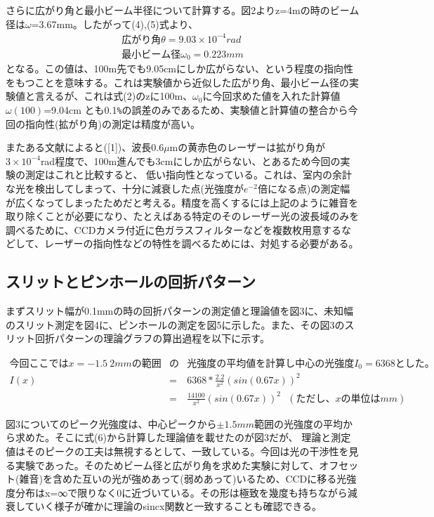 \documentclass[11pt,a4j]{jsarticle}
\begin{document}
  さらに広がり角と最小ビーム半径について計算する。図2よりz=4mの時のビーム径は$\omega$=3.67mm。したがって(4),(5)式より、
  \begin{eqnarray}
   広がり角  \theta = 9.03 × 10^{-4} rad \nonumber \\
   最小ビーム径  \omega_0 = 0.223mm \nonumber
  \end{eqnarray}
  となる。この値は、100m先でも9.05cmにしか広がらない、という程度の指向性をもつことを意味する。これは実験値から近似した広がり角、最小ビーム径の実験値と言えるが、これは式(2)のzに100m、$\omega_0$に今回求めた値を入れた計算値$\omega(100)$=9.04cm
  とも0.1\verb|%|の誤差のみであるため、実験値と計算値の整合から今回の指向性(拡がり角)の測定は精度が高い。
  
  またある文献によると([1])、波長0.6$\mu$mの黄赤色のレーザーは拡がり角が$3×10^{-4}$rad程度で、100m進んでも3cmにしか広がらない、とあるため今回の実験の測定はこれと比較すると、
  低い指向性となっている。これは、室内の余計な光を検出してしまって、十分に減衰した点(光強度が$e^{-2}$倍になる点)の測定幅が広くなってしまったためだと考える。精度を高くするには上記のように雑音を取り除くことが必要になり、たとえばある特定のそのレーザー光の波長域のみを調べるために、CCDカメラ付近に色ガラスフィルターなどを複数枚用意するなどして、レーザーの指向性などの特性を調べるためには、対処する必要がある。
  
  \clearpage
  
  \subsection{スリットとピンホールの回折パターン}
  まずスリット幅が0.1mmの時の回折パターンの測定値と理論値を図3に、未知幅のスリット測定を図4に、ピンホールの測定を図5に示した。また、その図3のスリット回折パターンの理論グラフの算出過程を以下に示す。

\begin{eqnarray}
今回ここではx=-1.5~2mmの範囲&の&光強度の平均値を計算し中心の光強度I_0 = 6368 とした。 \nonumber \\
I(x) &=& 6368 * \frac{2.2}{x^2} (sin(0.67x))^2 \nonumber \\
       &=& \frac{14100}{x^2} (sin(0.67x))^2 \ \ \ (ただし、xの単位はmm) \nonumber
\end{eqnarray}

  
  図3についてのピーク光強度は、中心ピークから$\pm 1.5mm$範囲の光強度の平均から求めた。そこに式(6)から計算した理論値を載せたのが図3だが、
  理論と測定値はそのピークの工夫は無視するとして、一致している。今回は光の干渉性を見る実験であった。そのためビーム径と広がり角を求めた実験に対して、オフセット(雑音)を含めた互いの光が強めあって(弱めあって)いるため、CCDに移る光強度分布はx=∞で限りなく0に近づいている。その形は極致を幾度も持ちながら減衰していく様子が確かに理論のsincx関数と一致することも確認できる。
\end{document}
